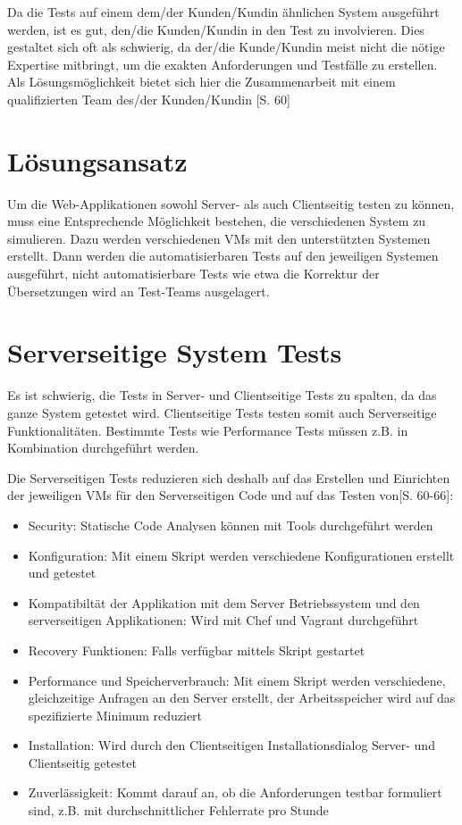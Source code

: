 \documentclass[a4paper,bibtotoc,oneside]{scrbook}
\begin{document}
Da die Tests auf einem dem/der Kunden/Kundin ähnlichen System ausgeführt werden, ist es gut, den/die Kunden/Kundin in den Test zu involvieren. Dies gestaltet sich oft als schwierig, da der/die Kunde/Kundin meist nicht die nötige Expertise mitbringt, um die exakten Anforderungen und Testfälle zu erstellen. Als Lösungsmöglichkeit bietet sich hier die Zusammenarbeit mit einem qualifizierten Team des/der Kunden/Kundin \cite{test_large_systems}[S. 60]

\section{Lösungsansatz}
Um die Web-Applikationen sowohl Server- als auch Clientseitig testen zu können, muss eine Entsprechende Möglichkeit bestehen, die verschiedenen System zu simulieren. Dazu werden verschiedenen VMs mit den unterstützten Systemen erstellt. Dann werden die automatisierbaren Tests auf den jeweiligen Systemen ausgeführt, nicht automatisierbare Tests wie etwa die Korrektur der Übersetzungen wird an Test-Teams ausgelagert.

\section{Serverseitige System Tests}
Es ist schwierig, die Tests in Server- und Clientseitige Tests zu spalten, da das ganze System getestet wird. Clientseitige Tests testen somit auch Serverseitige Funktionalitäten. Bestimmte Tests wie Performance Tests müssen z.B. in Kombination durchgeführt werden.

Die Serverseitigen Tests reduzieren sich deshalb auf das Erstellen und Einrichten der jeweiligen VMs für den Serverseitigen Code und auf das Testen von\cite{test_large_systems}[S. 60-66]:

\begin{itemize}
  \item Security: Statische Code Analysen können mit Tools durchgeführt werden
  \item Konfiguration: Mit einem Skript werden verschiedene Konfigurationen erstellt und getestet
  \item Kompatibiltät der Applikation mit dem Server Betriebssystem und den serverseitigen Applikationen: Wird mit Chef und Vagrant durchgeführt
  \item Recovery Funktionen: Falls verfügbar mittels Skript gestartet
  \item Performance und Speicherverbrauch: Mit einem Skript werden verschiedene, gleichzeitige Anfragen an den Server erstellt, der Arbeitsspeicher wird auf das spezifizierte Minimum reduziert
  \item Installation: Wird durch den Clientseitigen Installationsdialog Server- und Clientseitig getestet
  \item Zuverlässigkeit: Kommt darauf an, ob die Anforderungen testbar formuliert sind, z.B. mit durchschnittlicher Fehlerrate pro Stunde
\end{itemize}
\end{document}
